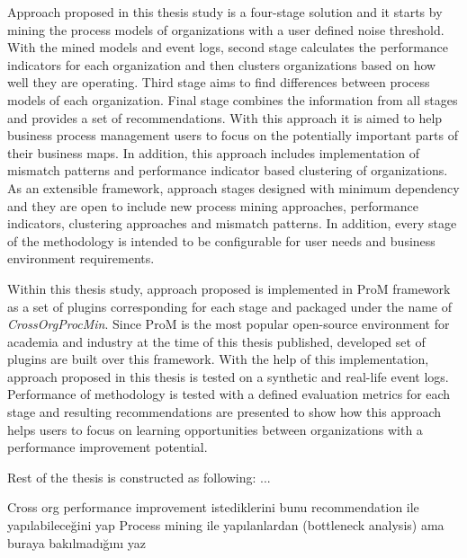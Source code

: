 Approach proposed in this thesis study is a four-stage solution and it starts by mining the process models of organizations with a user defined noise threshold. With the mined models and event logs, second stage calculates the performance indicators for each organization and then clusters organizations based on how well they are operating. Third stage aims to find differences between process models of each organization. Final stage combines the information from all stages and provides a set of recommendations. With this approach it is aimed to help business process management users to focus on the potentially important parts of their business maps. In addition, this approach includes implementation of mismatch patterns and performance indicator based clustering of organizations. As an extensible framework, approach stages designed with minimum dependency and they are open to include new  process mining approaches, performance indicators, clustering approaches and mismatch patterns. In addition, every stage of the methodology is intended to be configurable for user needs and business environment requirements.

Within this thesis study, approach proposed is implemented in ProM framework \cite{verbeek2010prom} as a set of plugins corresponding for each stage and packaged under the name of \textit{CrossOrgProcMin}. Since ProM is the most popular open-source environment for academia and industry at the time of this thesis published, developed set of plugins are built over this framework. With the help of this implementation, approach proposed in this thesis is tested on a synthetic and real-life event logs. Performance of methodology is tested with a defined evaluation metrics for each stage and resulting recommendations are presented to show how this approach helps users to focus on learning opportunities between organizations with a performance improvement potential. 

Rest of the thesis is constructed as following:
...

Cross org 
performance improvement istediklerini bunu recommendation ile yapılabileceğini yap
Process mining ile yapılanlardan (bottleneck analysis) ama buraya bakılmadığını yaz

